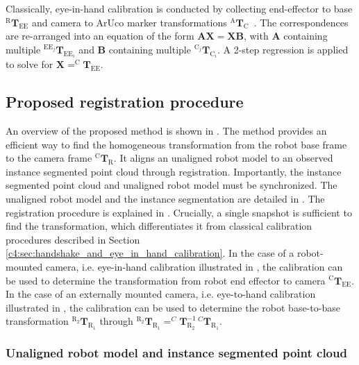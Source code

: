 Classically, eye-in-hand calibration is conducted by collecting end-effector to base $^\text{R}\mathbf{T}_\text{EE}$ and camera to ArUco marker transformations $^\text{A}\mathbf{T}_\text{C}$~\citep{eye_in_hand}. The correspondences are re-arranged into an equation of the form $\mathbf{A}\mathbf{X}=\mathbf{X}\mathbf{B}$, with $\mathbf{A}$ containing multiple $^{\text{EE}_j}\mathbf{T}_{\text{EE}_i}$ and $\mathbf{B}$ containing multiple $^{\text{C}_j}\mathbf{T}_{\text{C}_i}$. A 2-step regression is applied to solve for $\mathbf{X}=^\text{C}\mathbf{T}_\text{EE}$.

\subsection{Proposed registration procedure}
\label{c4:sec:proposed_calibration_procedure}
An overview of the proposed method is shown in . The method provides an efficient way to find the homogeneous transformation from the robot base frame to the camera frame $^\text{C}\mathbf{T}_\text{R}$. It aligns an unaligned robot model to an observed instance segmented point cloud through registration. Importantly, the instance segmented point cloud and unaligned robot model must be synchronized. The unaligned robot model and the instance segmentation are detailed in . The registration procedure is explained in . Crucially, a single snapshot is sufficient to find the transformation, which differentiates it from classical calibration procedures described in Section \ref{c4:sec:handshake_and_eye_in_hand_calibration}. In the case of a robot-mounted camera, i.e. eye-in-hand calibration illustrated in , the calibration can be used to determine the transformation from robot end effector to camera $^\text{C}\mathbf{T}_\text{EE}$. In the case of an externally mounted camera, i.e. eye-to-hand calibration illustrated in , the calibration can be used to determine the robot base-to-base transformation $^{\text{R}_2}\mathbf{T}_{\text{R}_1}$ through $^{\text{R}_2}\mathbf{T}_{\text{R}_1} = ^C\mathbf{T}^{-1}_{\text{R}_2}\,^{C}\mathbf{T}_{\text{R}_1}$.

\subsubsection{Unaligned robot model and instance segmented point cloud}
\label{c4:sec:unaligned_robot_model_and_instance_segmented_point_cloud}
